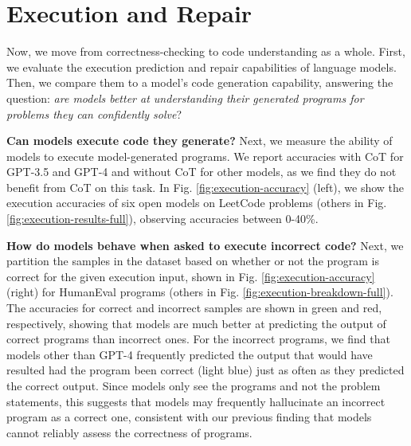 \section{Execution and Repair}
Now, we move from correctness-checking to code understanding as a whole. First, we evaluate the execution prediction and repair capabilities of language models. Then, we compare them to a model's code generation capability, answering the question: \textit{are models better at understanding their generated programs for problems they can confidently solve}?

\textbf{Can models execute code they generate?} Next, we measure the ability of models to execute model-generated programs. We report accuracies with CoT for GPT-3.5 and GPT-4 and without CoT for other models, as we find they do not benefit from CoT on this task. In Fig. \ref{fig:execution-accuracy} (left), we show the execution accuracies of six open models on LeetCode problems (others in Fig. \ref{fig:execution-results-full}), observing accuracies between 0-40\%.

\textbf{How do models behave when asked to execute incorrect code?}
Next, we partition the samples in the dataset based on whether or not the program is correct for the given execution input, shown in Fig. \ref{fig:execution-accuracy} (right) for HumanEval programs (others in Fig. \ref{fig:execution-breakdown-full}). The accuracies for correct and incorrect samples are shown in green and red, respectively, showing that models are much better at predicting the output of correct programs than incorrect ones. For the incorrect programs, we find that models other than GPT-4 frequently predicted the output that would have resulted had the program been correct (light blue) just as often as they predicted the correct output. Since models only see the programs and not the problem statements, this suggests that models may frequently hallucinate an incorrect program as a correct one, consistent with our previous finding that models cannot reliably assess the correctness of programs.

